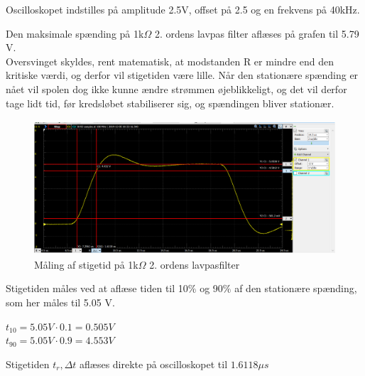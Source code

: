 Oscilloskopet indstilles  på amplitude 2.5V, offset på 2.5 og en frekvens på 40kHz.

Den maksimale spænding på 1k$\Omega$ 2. ordens lavpas filter aflæses på grafen til 5.79 V. \\


Oversvinget skyldes, rent matematisk, at modstanden R er mindre end den kritiske værdi, og derfor vil stigetiden være lille. Når den stationære spænding er nået vil spolen dog ikke kunne ændre strømmen øjeblikkeligt, og det vil derfor tage lidt tid, før kredsløbet stabiliserer sig, og spændingen bliver stationær. \\

\begin{figure}[h!]
\begin{center}
\includegraphics[height=5cm]{E_Fig/Rea_2_1_stigetid}
\caption{Måling af stigetid på 1k$\Omega$ 2. ordens lavpasfilter}
\label{Rea_2_1_stigetid}
\end{center}
\end{figure}


Stigetiden måles ved at aflæse tiden til 10$\%$ og 90$\%$ af den stationære spænding, som her måles til 5.05 V.\\
\begin{center}
$t_{10}=5.05 V \cdot 0.1 = 0.505 V$
\\
$t_{90}=5.05 V \cdot 0.9 = 4.553 V$
\end{center}
Stigetiden $t_r, \Delta t$ aflæses direkte på oscilloskopet til $1.6118 \mu s$

 
